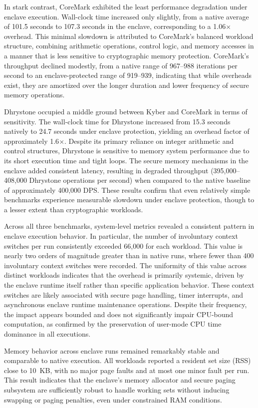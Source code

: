 In stark contrast, CoreMark exhibited the least performance degradation under enclave execution. Wall-clock time increased only slightly, from a native average of 101.5 seconds to 107.3 seconds in the enclave, corresponding to a 1.06$\times$ overhead. This minimal slowdown is attributed to CoreMark’s balanced workload structure, combining arithmetic operations, control logic, and memory accesses in a manner that is less sensitive to cryptographic memory protection. CoreMark’s throughput declined modestly, from a native range of 967--988 iterations per second to an enclave-protected range of 919--939, indicating that while overheads exist, they are amortized over the longer duration and lower frequency of secure memory operations.

Dhrystone occupied a middle ground between Kyber and CoreMark in terms of sensitivity. The wall-clock time for Dhrystone increased from 15.3 seconds natively to 24.7 seconds under enclave protection, yielding an overhead factor of approximately 1.6$\times$. Despite its primary reliance on integer arithmetic and control structures, Dhrystone is sensitive to memory system performance due to its short execution time and tight loops. The secure memory mechanisms in the enclave added consistent latency, resulting in degraded throughput (395,000--408,000 Dhrystone operations per second) when compared to the native baseline of approximately 400,000 DPS. These results confirm that even relatively simple benchmarks experience measurable slowdown under enclave protection, though to a lesser extent than cryptographic workloads.

Across all three benchmarks, system-level metrics revealed a consistent pattern in enclave execution behavior. In particular, the number of involuntary context switches per run consistently exceeded 66,000 for each workload. This value is nearly two orders of magnitude greater than in native runs, where fewer than 400 involuntary context switches were recorded. The uniformity of this value across distinct workloads indicates that the overhead is primarily systemic, driven by the enclave runtime itself rather than specific application behavior. These context switches are likely associated with secure page handling, timer interrupts, and asynchronous enclave runtime maintenance operations. Despite their frequency, the impact appears bounded and does not significantly impair CPU-bound computation, as confirmed by the preservation of user-mode CPU time dominance in all executions.

Memory behavior across enclave runs remained remarkably stable and comparable to native execution. All workloads reported a resident set size (RSS) close to 10~KB, with no major page faults and at most one minor fault per run. This result indicates that the enclave’s memory allocator and secure paging subsystem are sufficiently robust to handle working sets without inducing swapping or paging penalties, even under constrained RAM conditions.

